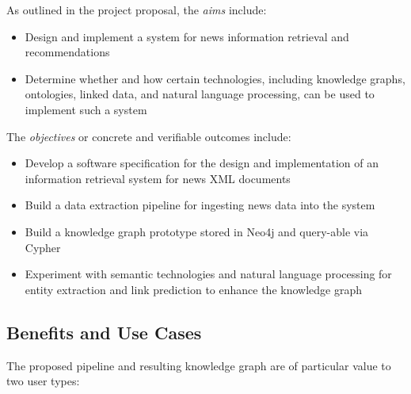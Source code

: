 \documentclass[11pt]{article}
\begin{document}
As outlined in the project proposal\cite{ek-proposal}, the \textit{aims} include:
\begin{itemize}
  \item Design and implement a system for news information retrieval and recommendations
  \item Determine whether and how certain technologies, including knowledge graphs, ontologies, linked data, and natural language processing, can be used to implement such a system
\end{itemize}

The \textit{objectives} or concrete and verifiable outcomes include:
\begin{itemize}
  \item Develop a software specification for the design and implementation of an information retrieval system for news XML documents
  \item Build a data extraction pipeline for ingesting news data into the system
  \item Build a knowledge graph prototype stored in Neo4j and query-able via Cypher
  \item Experiment with semantic technologies and natural language processing for entity extraction and link prediction to enhance the knowledge graph
\end{itemize}

\subsection{Benefits and Use Cases}
The proposed pipeline and resulting knowledge graph are of particular value to two user types:
\end{document}
